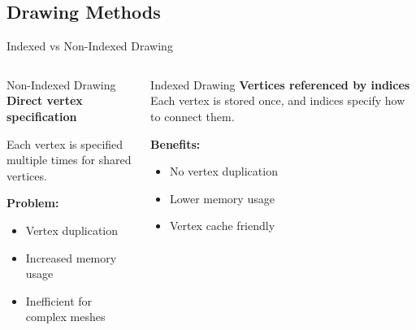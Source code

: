\subsection{Drawing Methods}
\begin{frame}{Indexed vs Non-Indexed Drawing}
  \footnotesize
  \begin{columns}
    \begin{column}{0.5\textwidth}
      \begin{conceptbox}{Non-Indexed Drawing}
        \textbf{Direct vertex specification}

        Each vertex is specified multiple times for shared vertices.

        \vspace{0.2cm}
        \textbf{Problem:}
        \begin{itemize}
          \item Vertex duplication
          \item Increased memory usage
          \item Inefficient for complex meshes
        \end{itemize}
      \end{conceptbox}
    \end{column}
    \begin{column}{0.5\textwidth}
      \begin{mathbox}{Indexed Drawing}
        \textbf{Vertices referenced by indices}
        Each vertex is stored once, and indices specify how to connect them.

        \vspace{0.2cm}
        \textbf{Benefits:}
        \begin{itemize}
          \item No vertex duplication
          \item Lower memory usage
          \item Vertex cache friendly
        \end{itemize}
      \end{mathbox}
    \end{column}
  \end{columns}

  \vspace{0.3cm}

\end{frame}
